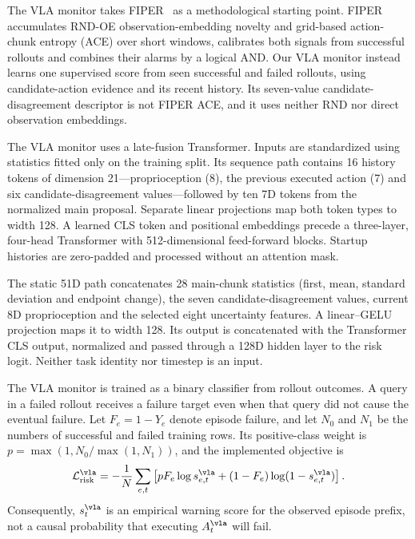 The VLA monitor takes FIPER~\cite{fiper} as a methodological starting point.
FIPER accumulates RND-OE observation-embedding novelty and grid-based
action-chunk entropy (ACE) over short windows, calibrates both signals from
successful rollouts and combines their alarms by a logical AND. Our VLA monitor
instead learns one supervised score from seen successful and failed rollouts,
using candidate-action evidence and its recent history. Its seven-value
candidate-disagreement descriptor is not FIPER ACE, and it uses neither RND nor
direct observation embeddings.

The VLA monitor uses a late-fusion Transformer. Inputs are standardized using
statistics fitted only on the training split. Its sequence path contains 16
history tokens of dimension 21---proprioception (8), the previous executed
action (7) and six candidate-disagreement values---followed by ten 7D tokens
from the normalized main proposal. Separate linear projections map both token
types to width 128. A learned CLS token and positional embeddings precede a
three-layer, four-head Transformer with 512-dimensional feed-forward blocks.
Startup histories are zero-padded and processed without an attention mask.

The static 51D path concatenates 28 main-chunk statistics (first, mean,
standard deviation and endpoint change), the seven candidate-disagreement
values, current 8D proprioception and the selected eight uncertainty features.
A linear--GELU projection maps it to width 128. Its output is concatenated with
the Transformer CLS output, normalized and passed through a 128D hidden layer
to the risk logit. Neither task identity nor timestep is an input.

The VLA monitor is trained as a binary classifier from rollout outcomes. A query
in a failed rollout receives a failure target even when that query did not
cause the eventual failure. Let \(F_e=1-Y_e\) denote episode failure, and let
\(N_0\) and \(N_1\) be the numbers of successful and failed training rows. Its
positive-class weight is
\(p=\max(1,N_0/\max(1,N_1))\), and the implemented objective is
\begin{equation}
  \mathcal{L}_{\mathrm{risk}}^{\vla}
  =-\frac{1}{N}\sum_{e,t}
  \left[
    pF_e\log s_{e,t}^{\vla}
    +(1-F_e)\log(1-s_{e,t}^{\vla})
  \right].
  \label{eq:risk-loss}
\end{equation}
Consequently, \(s_t^\vla\) is an empirical warning score for the observed
episode prefix, not a causal probability that executing \(A_t^\vla\) will fail.

